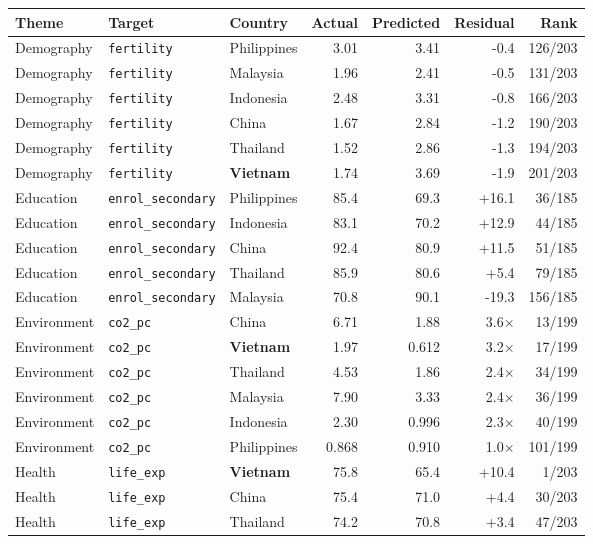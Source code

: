 \footnotesize
\begin{tabular}{lllrrrr}
\toprule
Theme & Target & Country & Actual & Predicted & Residual & Rank \\
\midrule
Demography & \texttt{fertility} & Philippines & 3.01 & 3.41 & -0.4 & 126/203 \\
Demography & \texttt{fertility} & Malaysia & 1.96 & 2.41 & -0.5 & 131/203 \\
Demography & \texttt{fertility} & Indonesia & 2.48 & 3.31 & -0.8 & 166/203 \\
Demography & \texttt{fertility} & China & 1.67 & 2.84 & -1.2 & 190/203 \\
Demography & \texttt{fertility} & Thailand & 1.52 & 2.86 & -1.3 & 194/203 \\
Demography & \texttt{fertility} & \textbf{Vietnam} & 1.74 & 3.69 & -1.9 & 201/203 \\
Education & \texttt{enrol\_secondary} & Philippines & 85.4 & 69.3 & +16.1 & 36/185 \\
Education & \texttt{enrol\_secondary} & Indonesia & 83.1 & 70.2 & +12.9 & 44/185 \\
Education & \texttt{enrol\_secondary} & China & 92.4 & 80.9 & +11.5 & 51/185 \\
Education & \texttt{enrol\_secondary} & Thailand & 85.9 & 80.6 & +5.4 & 79/185 \\
Education & \texttt{enrol\_secondary} & Malaysia & 70.8 & 90.1 & -19.3 & 156/185 \\
Environment & \texttt{co2\_pc} & China & 6.71 & 1.88 & 3.6$\times$ & 13/199 \\
Environment & \texttt{co2\_pc} & \textbf{Vietnam} & 1.97 & 0.612 & 3.2$\times$ & 17/199 \\
Environment & \texttt{co2\_pc} & Thailand & 4.53 & 1.86 & 2.4$\times$ & 34/199 \\
Environment & \texttt{co2\_pc} & Malaysia & 7.90 & 3.33 & 2.4$\times$ & 36/199 \\
Environment & \texttt{co2\_pc} & Indonesia & 2.30 & 0.996 & 2.3$\times$ & 40/199 \\
Environment & \texttt{co2\_pc} & Philippines & 0.868 & 0.910 & 1.0$\times$ & 101/199 \\
Health & \texttt{life\_exp} & \textbf{Vietnam} & 75.8 & 65.4 & +10.4 & 1/203 \\
Health & \texttt{life\_exp} & China & 75.4 & 71.0 & +4.4 & 30/203 \\
Health & \texttt{life\_exp} & Thailand & 74.2 & 70.8 & +3.4 & 47/203 \\

\end{tabular}
